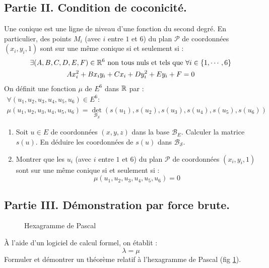 \subsection*{Partie II. Condition de \og coconicité\fg. }
Une conique est une ligne de niveau d'une fonction du second degré. En particulier, des points $M_i$ (avec $i$ entre $1$ et $6$) du plan $\mathcal P$ de coordonnées $(x_i,y_i,1)$  sont sur une même conique si et seulement si :
\begin{multline*}
 \exists (A,B,C,D,E,F)\in \mathbb{R}^6 \text{ non tous nuls et tels que } \forall i\in\{1,\cdots,6\} \\
Ax_i^2 + Bx_iy_i + C x_i + Dy_i^2 + Ey_i + F =0
\end{multline*}
On définit une fonction $\mu$ de $E^6$ dans $\mathbb{R}$ par :
\begin{multline*}
 \forall (u_1,u_2,u_3,u_4,u_5,u_6)\in E^6 :\\
\mu(u_1,u_2,u_3,u_4,u_5,u_6) = \det_{\mathcal B_{\mathcal S}}(s(u_1),s(u_2),s(u_3),s(u_4),s(u_5),s(u_6))
\end{multline*}

\begin{enumerate}
 \item Soit $u\in E$ de coordonnées $(x,y,z)$ dans la base $\mathcal B_E$. Calculer la matrice $s(u)$. En déduire les coordonnées de $s(u)$ dans $\mathcal B_{\mathcal S}$.
\item Montrer que les $u_i$ (avec $i$ entre $1$ et $6$) du plan $\mathcal P$ de coordonnées $(x_i,y_i,1)$  sont sur une même conique si et seulement si :
\begin{displaymath}
 \mu(u_1,u_2,u_3,u_4,u_5,u_6) = 0
\end{displaymath}
\end{enumerate}

\subsection*{Partie III. Démonstration par \og force brute\fg.}
\begin{figure}[ht]
 \centering
 
 \caption{Hexagramme de Pascal}
 \label{fig:EhexaP_3}
\end{figure}
\`A l'aide d'un logiciel de calcul formel, on établit :
\begin{displaymath}
 \lambda = \mu
\end{displaymath}
Formuler et démontrer un théorème relatif à l'hexagramme de Pascal (fig \ref{fig:EhexaP_3}).

